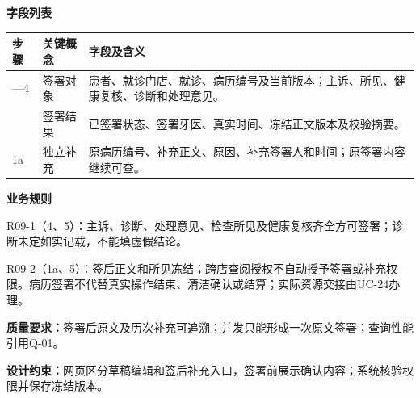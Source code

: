 \documentclass[UTF8,a4paper,zihao=-4,fontset=none]{ctexart}
\begin{document}
\noindent\textbf{字段列表}\par
{\setlength{\tabcolsep}{3pt}\renewcommand{\arraystretch}{1.04}
\noindent\begin{tabular}{@{}>{\raggedright\arraybackslash}p{1.2cm}>{\raggedright\arraybackslash}p{2.2cm}>{\raggedright\arraybackslash}p{12.3cm}@{}}
\toprule
步骤 & 关键概念 & 字段及含义 \\ \midrule
1—4 & 签署对象 & 患者、就诊门店、就诊、病历编号及当前版本；主诉、所见、健康复核、诊断和处理意见。 \\
5 & 签署结果 & 已签署状态、签署牙医、真实时间、冻结正文版本及校验摘要。 \\
1a & 独立补充 & 原病历编号、补充正文、原因、补充签署人和时间；原签署内容继续可查。 \\
\bottomrule
\end{tabular}\par}
\smallskip
\noindent\textbf{业务规则}\par
\noindent R09-1（4、5）：主诉、诊断、处理意见、检查所见及健康复核齐全方可签署；诊断未定如实记载，不能填虚假结论。\par
\noindent R09-2（1a、5）：签后正文和所见冻结；跨店查阅授权不自动授予签署或补充权限。病历签署不代替真实操作结束、清洁确认或结算；实际资源交接由UC-24办理。\par
\smallskip
\noindent\textbf{质量要求：}签署后原文及历次补充可追溯；并发只能形成一次原文签署；查询性能引用Q-01。\par
\noindent\textbf{设计约束：}网页区分草稿编辑和签后补充入口，签署前展示确认内容；系统核验权限并保存冻结版本。\par
\endgroup
\clearpage
\end{document}
